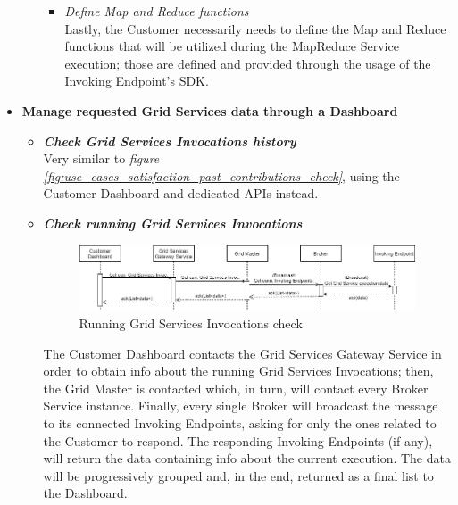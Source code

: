 \begin{itemize}
\begin{itemize}
\begin{itemize}
            \item \textit{Define Map and Reduce functions}\\
            Lastly, the Customer necessarily needs to define the Map and Reduce functions that will be utilized during the MapReduce Service execution; those are defined and provided through the usage of the Invoking Endpoint's SDK.
        \end{itemize}
    \end{itemize}
    \item \textbf{Manage requested Grid Services data through a Dashboard}\\
    \begin{itemize}
        \item \textbf{\textit{Check Grid Services Invocations history}}\\
        Very similar to \textit{figure \ref{fig:use_cases_satisfaction_past_contributions_check}}, using the Customer Dashboard and dedicated APIs instead.

        \item \textbf{\textit{Check running Grid Services Invocations}}\\
        \begin{figure}[!ht]
            \centering
            \includegraphics[width=\linewidth]{document/chapters/chapter_5/images/use_cases_satisfaction_current_grid_services.jpg}
            \caption{Running Grid Services Invocations check}
            \label{fig:use_cases_satisfaction_current_grid_services}
        \end{figure}

        The Customer Dashboard contacts the Grid Services Gateway Service in order to obtain info about the running Grid Services Invocations; then, the Grid Master is contacted which, in turn, will contact every Broker Service instance. Finally, every single Broker will broadcast the message to its connected Invoking Endpoints, asking for only the ones related to the Customer to respond. The responding Invoking Endpoints (if any), will return the data containing info about the current execution. The data will be progressively grouped and, in the end, returned as a final list to the Dashboard. 


\end{itemize}
\end{itemize}
